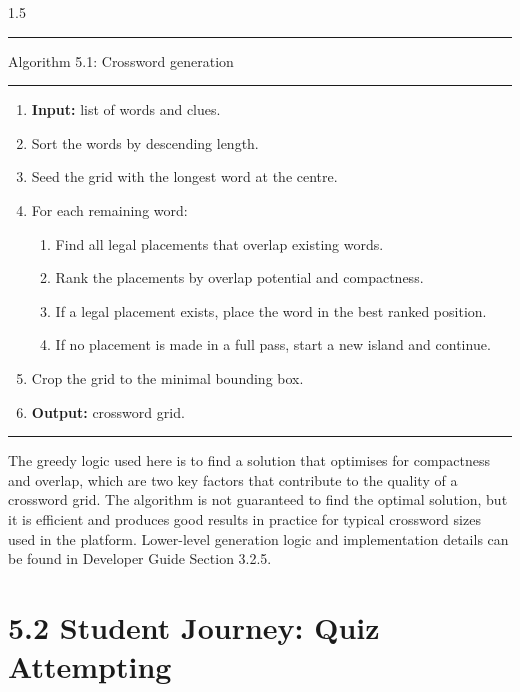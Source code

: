 \documentclass[
  12pt,
  a4paper,
]{report}
\begin{document}
\begin{center}
\begin{minipage}{0.95\linewidth}
\begin{spacing}{1.5}
\noindent\rule{\linewidth}{0.4pt}
\noindent Algorithm 5.1: Crossword generation\par\vspace{-0.35\baselineskip}
\noindent\rule{\linewidth}{0.4pt}
\begingroup
\begin{enumerate}
  \item \textbf{Input:} list of words and clues.
  \item Sort the words by descending length.
  \item Seed the grid with the longest word at the centre.
  \item For each remaining word:
  \begin{enumerate}
    \item Find all legal placements that overlap existing words.
    \item Rank the placements by overlap potential and compactness.
    \item If a legal placement exists, place the word in the best ranked position.
    \item If no placement is made in a full pass, start a new island and continue.
  \end{enumerate}
  \item Crop the grid to the minimal bounding box.
  \item \textbf{Output:} crossword grid.
\end{enumerate}
\vspace{-0.4\baselineskip}
\noindent\rule{\linewidth}{0.4pt}
\endgroup
\end{spacing}
\end{minipage}
\end{center}

The greedy logic used here is to find a solution that optimises for compactness and overlap,
which are two key factors that contribute to the quality of a crossword grid.
The algorithm is not guaranteed to find the optimal solution, but it is efficient and produces good results
in practice for typical crossword sizes used in the platform. Lower-level generation logic and
implementation details can be found in Developer Guide Section 3.2.5.


\hypertarget{quiz-attempt-lifecycle}{%
\section{5.2 Student Journey: Quiz Attempting
}\label{quiz-attempt-lifecycle}}
\end{document}
